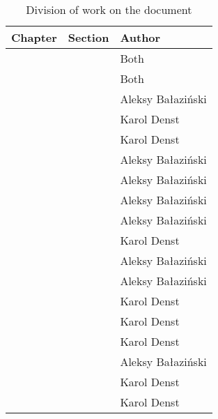 \begin{table}[h]
    \centering
    \begin{tabular}{|l|l|l|}
    \hline
    Chapter  & Section    & Author        \\ \hline
    \nameref{ch:introduction} &  & Both \\
    \nameref{ch:division_of_work} &  & Both \\
    \nameref{ch:theoretical_foundations} & \nameref{sec:non_euclidean_geometry} & Aleksy Bałaziński      \\
    \nameref{ch:theoretical_foundations} & \nameref{sec:theory_theory_marching_cubes} & Karol Denst      \\
    \nameref{ch:theoretical_foundations} & \nameref{sec:theory_theory_models} & Karol Denst      \\
    \nameref{ch:theoretical_foundations} & \nameref{sec:theory_theory_day_night_cycle} & Aleksy Bałaziński      \\
    \nameref{ch:theoretical_foundations} & \nameref{sec:theory_theory_lighting} & Aleksy Bałaziński      \\
    \nameref{ch:implementation} & \nameref{sec:technologies_selection} & Aleksy Bałaziński      \\
    \nameref{ch:implementation} & \nameref{sec:game_objects_management} & Aleksy Bałaziński      \\
    \nameref{ch:implementation} & \nameref{sec:implementation_terrain} & Karol Denst      \\
    \nameref{ch:implementation} & \nameref{sec:chunk-worker} & Aleksy Bałaziński      \\
    \nameref{ch:implementation} & \nameref{sec:implementation_rendering} & Aleksy Bałaziński      \\
    \nameref{ch:implementation} & \nameref{sec:two_dimensional_graphics} & Karol Denst      \\
    \nameref{ch:testing} & & Karol Denst \\
    \nameref{ch:user_manual} & & Karol Denst \\
    \nameref{ch:results} & & Aleksy Bałaziński \\
    \nameref{ch:problems} & & Karol Denst \\
    \nameref{ch:improvements} & & Karol Denst \\
    \hline
    \end{tabular}
    \caption{Division of work on the document}
    \label{tab:division_of_work_on_the_document}
\end{table}